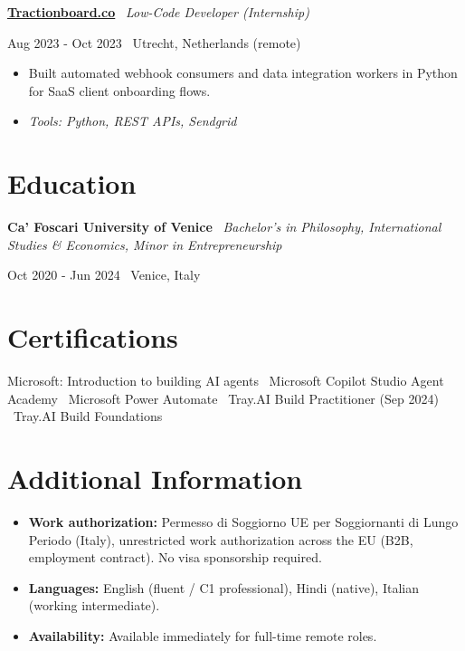 \documentclass[a4paper,10pt]{article}
\newcommand{\role}[4]{%
  \vspace{2pt}\noindent
  \begin{minipage}[t]{0.70\textwidth}\raggedright\textbf{#1} \textbullet\ \textit{#3}\end{minipage}%
  \hfill
  \begin{minipage}[t]{0.28\textwidth}\raggedleft\footnotesize\color{gray}#2 \textbullet\ #4\end{minipage}%
  \vspace{1pt}%
}
\begin{document}
\role{\href{https://tractionboard.co}{Tractionboard.co}}{Aug 2023 - Oct 2023}{Low-Code Developer (Internship)}{Utrecht, Netherlands (remote)}
\begin{itemize}
  \item Built automated webhook consumers and data integration workers in Python for SaaS client onboarding flows.
  \item \textit{Tools: Python, REST APIs, Sendgrid}
\end{itemize}

\section{Education}
\role{Ca' Foscari University of Venice}{Oct 2020 - Jun 2024}{Bachelor's in Philosophy, International Studies \& Economics, Minor in Entrepreneurship}{Venice, Italy}

\section{Certifications}
Microsoft: Introduction to building AI agents \textbullet\ Microsoft Copilot Studio Agent Academy \textbullet\ Microsoft Power Automate \textbullet\ Tray.AI Build Practitioner (Sep 2024) \textbullet\ Tray.AI Build Foundations

\section{Additional Information}
\begin{itemize}
  \item \textbf{Work authorization:} Permesso di Soggiorno UE per Soggiornanti di Lungo Periodo (Italy), unrestricted work authorization across the EU (B2B, employment contract). No visa sponsorship required.
  \item \textbf{Languages:} English (fluent / C1 professional), Hindi (native), Italian (working intermediate).
  \item \textbf{Availability:} Available immediately for full-time remote roles.
\end{itemize}

\end{document}
